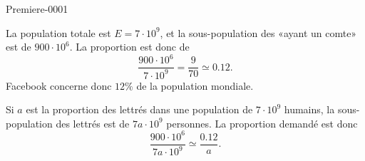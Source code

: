 
\begin{corrige}{Premiere-0001}

    La population totale est \( E=7\cdot 10^9\), et la sous-population des «ayant un comte» est de \( 900\cdot 10^6\). La proportion est donc de
    \begin{equation}
        \frac{ 900\cdot 10^6 }{ 7\cdot 10^9 }=\frac{ 9 }{ 70 }\simeq 0.12.
    \end{equation}
    Facebook concerne donc \( 12\%\) de la population mondiale.

    Si \( a\) est la proportion des lettrés dans une population de \( 7\cdot 10^9\) humains, la sous-population des lettrés est de \( 7a\cdot 10^9\) personnes. La proportion demandé est donc
    \begin{equation}
        \frac{ 900\cdot 10^6 }{ 7a\cdot 10^9 }\simeq \frac{ 0.12 }{ a }.
    \end{equation}

\end{corrige}
